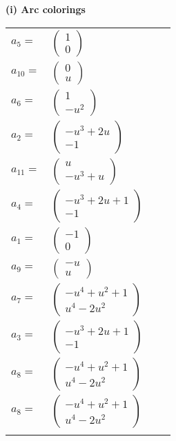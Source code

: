 \documentclass[1p]{elsarticle_modified}
\theoremstyle{definition}
\begin{document}
\flushleft \textbf{(i) Arc colorings}\\
\begin{tabular}{m{7pt} m{180pt} m{7pt} m{180pt} }
\flushright $a_{5}=$&$\begin{pmatrix}1\\0\end{pmatrix}$ \\
\flushright $a_{10}=$&$\begin{pmatrix}0\\u\end{pmatrix}$ \\
\flushright $a_{6}=$&$\begin{pmatrix}1\\- u^2\end{pmatrix}$ \\
\flushright $a_{2}=$&$\begin{pmatrix}- u^3+2 u\\-1\end{pmatrix}$ \\
\flushright $a_{11}=$&$\begin{pmatrix}u\\- u^3+u\end{pmatrix}$ \\
\flushright $a_{4}=$&$\begin{pmatrix}- u^3+2 u+1\\-1\end{pmatrix}$ \\
\flushright $a_{1}=$&$\begin{pmatrix}-1\\0\end{pmatrix}$ \\
\flushright $a_{9}=$&$\begin{pmatrix}- u\\u\end{pmatrix}$ \\
\flushright $a_{7}=$&$\begin{pmatrix}- u^4+u^2+1\\u^4-2 u^2\end{pmatrix}$ \\
\flushright $a_{3}=$&$\begin{pmatrix}- u^3+2 u+1\\-1\end{pmatrix}$ \\
\flushright $a_{8}=$&$\begin{pmatrix}- u^4+u^2+1\\u^4-2 u^2\end{pmatrix}$\\ \flushright $a_{8}=$&$\begin{pmatrix}- u^4+u^2+1\\u^4-2 u^2\end{pmatrix}$\\&\end{tabular}
\end{document}

